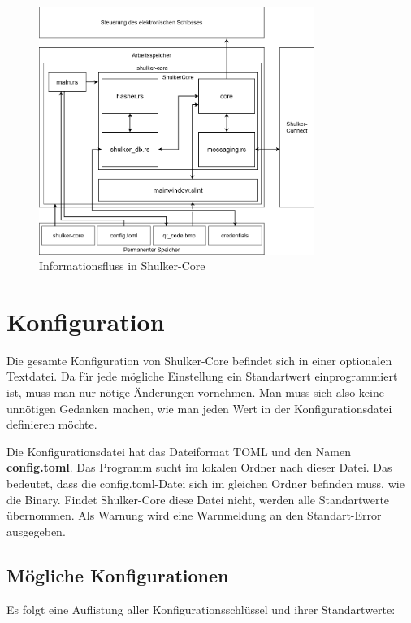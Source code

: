\begin{figure}[H]
    \begin{center}
        \hspace*{2cm}
        \includegraphics[width=0.8\textwidth]{images/core/informationsfluss.png}
        \caption{Informationsfluss in Shulker-Core}
    \end{center}
\end{figure}


\section{Konfiguration}
Die gesamte Konfiguration von Shulker-Core befindet sich in einer optionalen Textdatei. Da für jede mögliche Einstellung ein
Standartwert einprogrammiert ist, muss man nur nötige Änderungen vornehmen. Man muss sich also keine unnötigen Gedanken machen,
wie man jeden Wert in der Konfigurationsdatei definieren möchte.

Die Konfigurationsdatei hat das Dateiformat TOML und den Namen \textbf{config.toml}. Das Programm sucht im lokalen Ordner
nach dieser Datei. Das bedeutet, dass die config.toml-Datei sich im gleichen Ordner befinden muss, wie die Binary. Findet
Shulker-Core diese Datei nicht, werden alle Standartwerte übernommen. Als Warnung wird eine 
Warnmeldung an den Standart-Error ausgegeben.

\subsection{Mögliche Konfigurationen}
Es folgt eine Auflistung aller Konfigurationsschlüssel und ihrer Standartwerte:


